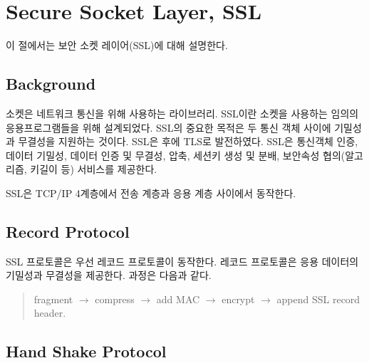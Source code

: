 \newpage
\section{Secure Socket Layer, SSL}

이 절에서는 보안 소켓 레이어(SSL)에 대해 설명한다.

\subsection*{Background}

소켓은 네트워크 통신을 위해 사용하는 라이브러리. SSL이란 소켓을 사용하는 임의의
응용프로그램들을 위해 설계되었다. SSL의 중요한 목적은 두 통신 객체 사이에
기밀성과 무결성을 지원하는 것이다. SSL은 후에 TLS로 발전하였다. SSL은 통신객체
인증, 데이터 기밀성, 데이터 인증 및 무결성, 압축, 세션키 생성 및 분배, 보안속성
협의(알고리즘, 키길이 등) 서비스를 제공한다.

SSL은 TCP/IP 4계층에서 전송 계층과 응용 계층 사이에서 동작한다.

\subsection*{Record Protocol}

\def\record{\textsf{Record}}

SSL 프로토콜은 우선 레코드 프로토콜이 동작한다. 레코드 프로토콜은 응용 데이터의
기밀성과 무결성을 제공한다. 과정은 다음과 같다.
\begin{quote}
  \centering
  fragment $\to$ compress $\to$ add MAC $\to$ encrypt $\to$ append SSL record
  header.
\end{quote}

\subsection*{Hand Shake Protocol}

